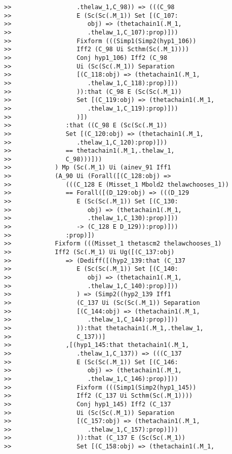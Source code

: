 \documentclass[12pt]{article}
\begin{document}
\begin{verbatim}
>>                  .thelaw_1,C_98)) => (((C_98
>>                  E (Sc(Sc(.M_1)) Set [(C_107:
>>                     obj) => (thetachain1(.M_1,
>>                     .thelaw_1,C_107):prop)]))
>>                  Fixform (((Simp1(Simp2(hyp1_106))
>>                  Iff2 (C_98 Ui Scthm(Sc(.M_1))))
>>                  Conj hyp1_106) Iff2 (C_98
>>                  Ui (Sc(Sc(.M_1)) Separation
>>                  [(C_118:obj) => (thetachain1(.M_1,
>>                     .thelaw_1,C_118):prop)]))
>>                  )):that (C_98 E (Sc(Sc(.M_1))
>>                  Set [(C_119:obj) => (thetachain1(.M_1,
>>                     .thelaw_1,C_119):prop)]))
>>                  )])
>>               :that ((C_98 E (Sc(Sc(.M_1))
>>               Set [(C_120:obj) => (thetachain1(.M_1,
>>                  .thelaw_1,C_120):prop)]))
>>               == thetachain1(.M_1,.thelaw_1,
>>               C_98)))]))
>>            ) Mp (Sc(.M_1) Ui (ainev_91 Iff1
>>            (A_90 Ui (Forall([(C_128:obj) =>
>>               (((C_128 E (Misset_1 Mbold2 thelawchooses_1))
>>               == Forall([(D_129:obj) => (((D_129
>>                  E (Sc(Sc(.M_1)) Set [(C_130:
>>                     obj) => (thetachain1(.M_1,
>>                     .thelaw_1,C_130):prop)]))
>>                  -> (C_128 E D_129)):prop)]))
>>               :prop)])
>>            Fixform (((Misset_1 thetascm2 thelawchooses_1)
>>            Iff2 (Sc(.M_1) Ui Ug([(C_137:obj)
>>               => (Dediff([(hyp2_139:that (C_137
>>                  E (Sc(Sc(.M_1)) Set [(C_140:
>>                     obj) => (thetachain1(.M_1,
>>                     .thelaw_1,C_140):prop)]))
>>                  ) => (Simp2((hyp2_139 Iff1
>>                  (C_137 Ui (Sc(Sc(.M_1)) Separation
>>                  [(C_144:obj) => (thetachain1(.M_1,
>>                     .thelaw_1,C_144):prop)]))
>>                  )):that thetachain1(.M_1,.thelaw_1,
>>                  C_137))]
>>               ,[(hyp1_145:that thetachain1(.M_1,
>>                  .thelaw_1,C_137)) => (((C_137
>>                  E (Sc(Sc(.M_1)) Set [(C_146:
>>                     obj) => (thetachain1(.M_1,
>>                     .thelaw_1,C_146):prop)]))
>>                  Fixform (((Simp1(Simp2(hyp1_145))
>>                  Iff2 (C_137 Ui Scthm(Sc(.M_1))))
>>                  Conj hyp1_145) Iff2 (C_137
>>                  Ui (Sc(Sc(.M_1)) Separation
>>                  [(C_157:obj) => (thetachain1(.M_1,
>>                     .thelaw_1,C_157):prop)]))
>>                  )):that (C_137 E (Sc(Sc(.M_1))
>>                  Set [(C_158:obj) => (thetachain1(.M_1,

\end{verbatim}
\end{document}
